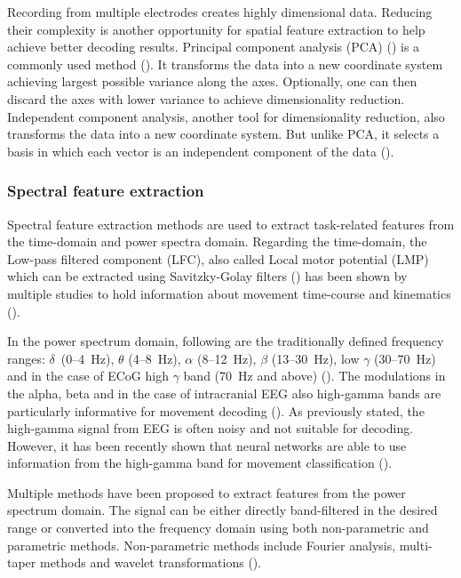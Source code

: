 Recording from multiple electrodes creates highly dimensional data. Reducing their complexity is another opportunity for spatial feature extraction to help achieve better decoding results. Principal component analysis (PCA) (\cite{pca}) is a commonly used method (\cite{volkova-review}). It transforms the data into a new coordinate system achieving largest possible variance along the axes. Optionally, one can then discard the axes with lower variance to achieve dimensionality reduction. Independent component analysis, another tool for dimensionality reduction, also transforms the data into a new coordinate system. 
But unlike PCA, it selects a basis in which each vector is an independent component of the data (\cite{ica}).

\subsubsection{Spectral feature extraction}
Spectral feature extraction methods are used to extract task-related features from the time-domain and power spectra domain. Regarding the time-domain, the Low-pass filtered component (LFC), also called Local motor potential (LMP) which can be extracted using Savitzky-Golay filters (\cite{multitaper-31}) has been shown by multiple studies to hold information about movement time-course and kinematics (\cite{schalk-2007, Pistohl2008PredictionOA, ball-2019}). 

In the power spectrum domain, following are the traditionally defined frequency ranges: $\delta$~(0–4~Hz), $\theta$ (4–8~Hz), $\alpha$ (8–12~Hz), $\beta$ (13–30~Hz), low $\gamma$ (30–70~Hz) and in the case of ECoG high $\gamma$ band (70~Hz and above) (\cite{hammer-predominance-2016}). The modulations in the alpha, beta and in the case of intracranial EEG also high-gamma bands are particularly informative for movement decoding (\cite{ball-hg-importance, 34-gunduz-hg}). As previously stated, the high-gamma signal from EEG is often noisy and not suitable for decoding. However, it has been recently shown that neural networks are able to use information from the high-gamma band for movement classification (\cite{schirrmeister-deep-2017}).

Multiple methods have been proposed to extract features from the power spectrum domain.
The signal can be either directly band-filtered in the desired range or converted into the frequency domain using both non-parametric and parametric methods.
Non-parametric methods include Fourier analysis, multi-taper methods and wavelet transformations (\cite{volkova-review}).

